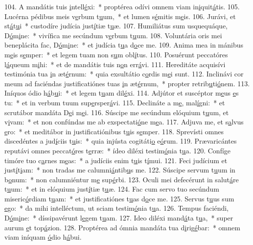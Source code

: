 104. A mandátis tuis \uline{i}ntell\uline{é}xi:~* proptérea odívi omnem viam in\uline{i}quit\uline{á}tis.
105. Lucérna pédibus meis v\uline{e}rbum t\uline{u}um,~* et lumen s\uline{é}mitis m\uline{e}is.
106. Jurávi, et st\uline{á}t\uline{u}i~* custodíre judícia just\uline{í}tiæ t\uline{u}æ.
107. Humiliátus sum usquequáque, D\uline{ó}m\uline{i}ne:~* vivífica me secúndum v\uline{e}rbum t\uline{u}um.
108. Voluntária oris mei beneplácita fac, D\uline{ó}m\uline{i}ne:~* et judícia t\uline{u}a d\uline{o}ce me.
109. Anima mea in mánibus m\uline{e}is s\uline{e}mper:~* et legem tuam non s\uline{u}m obl\uline{í}tus.
110. Posuérunt peccatóres l\uline{á}queum m\uline{i}hi:~* et de mandátis tuis n\uline{o}n err\uline{á}vi.
111. Hereditáte acquisívi testimónia tua \uline{i}n æt\uline{é}rnum:~* quia exsultátio c\uline{o}rdis m\uline{e}i sunt.
112. Inclinávi cor meum ad faciéndas justificatiónes tuas \uline{i}n æt\uline{é}rnum,~* propter retrib\uline{u}ti\uline{ó}nem.
113. Iníquos ódio h\uline{á}b\uline{u}i:~* et legem t\uline{u}am dil\uline{é}xi.
114. Adjútor et suscéptor m\uline{e}us \uline{e}s tu:~* et in verbum tuum sup\uline{e}rsper\uline{á}vi.
115. Declináte a m\uline{e}, mal\uline{í}gni:~* et scrutábor mandáta D\uline{e}i m\uline{e}i.
116. Súscipe me secúndum elóquium t\uline{u}um, et v\uline{i}vam:~* et non confúndas me ab exspectati\uline{ó}ne m\uline{e}a.
117. Adjuva me, et s\uline{a}lvus \uline{e}ro:~* et meditábor in justificatiónibus t\uline{u}is s\uline{e}mper.
118. Sprevísti omnes discedéntes a jud\uline{í}ciis t\uline{u}is:~* quia injústa cogitáti\uline{o} e\uline{ó}rum.
119. Prævaricántes reputávi omnes peccat\uline{ó}res t\uline{e}rræ:~* ídeo diléxi testim\uline{ó}nia t\uline{u}a.
120. Confíge timóre tuo c\uline{a}rnes m\uline{e}as:~* a judíciis enim t\uline{u}is t\uline{í}mui.
121. Feci judícium et just\uline{í}t\uline{i}am:~* non tradas me calumni\uline{á}ntib\uline{u}s me.
122. Súscipe servum t\uline{u}um in b\uline{o}num:~* non calumniéntur m\uline{e} sup\uline{é}rbi.
123. Oculi mei defecérunt in salut\uline{á}re t\uline{u}um:~* et in elóquium just\uline{í}tiæ t\uline{u}æ.
124. Fac cum servo tuo secúndum miseric\uline{ó}rdiam t\uline{u}am:~* et justificatiónes t\uline{u}as d\uline{o}ce me.
125. Servus t\uline{u}us sum \uline{e}go:~* da mihi intelléctum, ut sciam testim\uline{ó}nia t\uline{u}a.
126. Tempus faciéndi, D\uline{ó}m\uline{i}ne:~* díssipavérunt l\uline{e}gem t\uline{u}am.
127. Ideo diléxi mand\uline{á}ta t\uline{u}a,~* super aurum \uline{e}t top\uline{á}zion.
128. Proptérea ad ómnia mandáta tua d\uline{i}rig\uline{é}bar:~* omnem viam iníquam \uline{ó}dio h\uline{á}bui.
